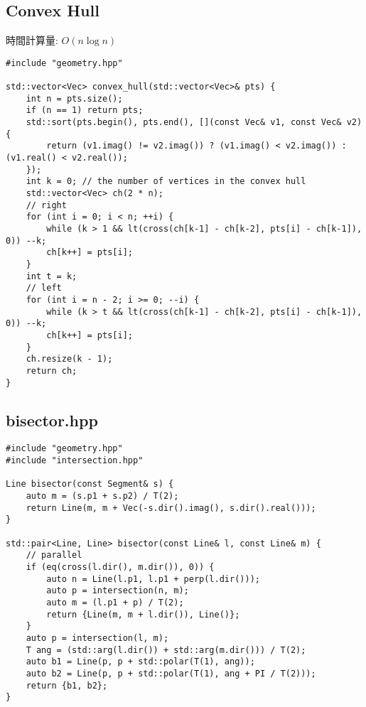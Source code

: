 \subsection{Convex Hull}

\begin{small}
時間計算量: $O(n\log n)$
\end{small}

\begin{lstlisting}
#include "geometry.hpp"

std::vector<Vec> convex_hull(std::vector<Vec>& pts) {
    int n = pts.size();
    if (n == 1) return pts;
    std::sort(pts.begin(), pts.end(), [](const Vec& v1, const Vec& v2) {
        return (v1.imag() != v2.imag()) ? (v1.imag() < v2.imag()) : (v1.real() < v2.real());
    });
    int k = 0; // the number of vertices in the convex hull
    std::vector<Vec> ch(2 * n);
    // right
    for (int i = 0; i < n; ++i) {
        while (k > 1 && lt(cross(ch[k-1] - ch[k-2], pts[i] - ch[k-1]), 0)) --k;
        ch[k++] = pts[i];
    }
    int t = k;
    // left
    for (int i = n - 2; i >= 0; --i) {
        while (k > t && lt(cross(ch[k-1] - ch[k-2], pts[i] - ch[k-1]), 0)) --k;
        ch[k++] = pts[i];
    }
    ch.resize(k - 1);
    return ch;
}
\end{lstlisting}

\subsection{bisector.hpp}

\begin{lstlisting}
#include "geometry.hpp"
#include "intersection.hpp"

Line bisector(const Segment& s) {
    auto m = (s.p1 + s.p2) / T(2);
    return Line(m, m + Vec(-s.dir().imag(), s.dir().real()));
}

std::pair<Line, Line> bisector(const Line& l, const Line& m) {
    // parallel
    if (eq(cross(l.dir(), m.dir()), 0)) {
        auto n = Line(l.p1, l.p1 + perp(l.dir()));
        auto p = intersection(n, m);
        auto m = (l.p1 + p) / T(2);
        return {Line(m, m + l.dir()), Line()};
    }
    auto p = intersection(l, m);
    T ang = (std::arg(l.dir()) + std::arg(m.dir())) / T(2);
    auto b1 = Line(p, p + std::polar(T(1), ang));
    auto b2 = Line(p, p + std::polar(T(1), ang + PI / T(2)));
    return {b1, b2};
}

\end{lstlisting}